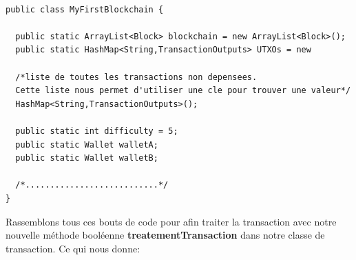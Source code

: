 \documentclass[12pt]{report}
\begin{document}
\begin{lstlisting}

public class MyFirstBlockchain {
	
  public static ArrayList<Block> blockchain = new ArrayList<Block>();
  public static HashMap<String,TransactionOutputs> UTXOs = new
	
  /*liste de toutes les transactions non depensees.
  Cette liste nous permet d'utiliser une cle pour trouver une valeur*/
  HashMap<String,TransactionOutputs>(); 
  
  public static int difficulty = 5;
  public static Wallet walletA;
  public static Wallet walletB;
	
  /*...........................*/
}	
\end{lstlisting}

\hspace{1cm}Rassemblons tous ces bouts de code pour afin traiter la transaction avec notre nouvelle méthode booléenne \textbf{treatementTransaction} dans notre classe de transaction. Ce qui nous donne:
\end{document}

